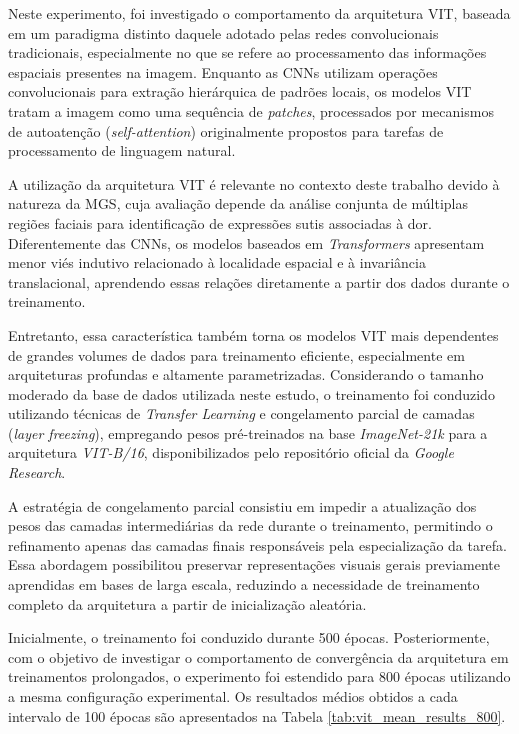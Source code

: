 Neste experimento, foi investigado o comportamento da arquitetura \acs{VIT}, baseada em um paradigma distinto daquele adotado pelas redes convolucionais tradicionais, especialmente no que se refere ao processamento das informações espaciais presentes na imagem. Enquanto as \acsp{CNN} utilizam operações convolucionais para extração hierárquica de padrões locais, os modelos \acs{VIT} tratam a imagem como uma sequência de \textit{patches}, processados por mecanismos de autoatenção (\textit{self-attention}) originalmente propostos para tarefas de processamento de linguagem natural.

A utilização da arquitetura \acs{VIT} é relevante no contexto deste trabalho devido à natureza da \acs{MGS}, cuja avaliação depende da análise conjunta de múltiplas regiões faciais para identificação de expressões sutis associadas à dor. Diferentemente das \acsp{CNN}, os modelos baseados em \textit{Transformers} apresentam menor viés indutivo relacionado à localidade espacial e à invariância translacional, aprendendo essas relações diretamente a partir dos dados durante o treinamento.

Entretanto, essa característica também torna os modelos \acs{VIT} mais dependentes de grandes volumes de dados para treinamento eficiente, especialmente em arquiteturas profundas e altamente parametrizadas. Considerando o tamanho moderado da base de dados utilizada neste estudo, o treinamento foi conduzido utilizando técnicas de \textit{Transfer Learning} e congelamento parcial de camadas (\textit{layer freezing}), empregando pesos pré-treinados na base \textit{ImageNet-21k} para a arquitetura \textit{\acs{VIT}-B/16}, disponibilizados pelo repositório oficial da \textit{Google Research}.

A estratégia de congelamento parcial consistiu em impedir a atualização dos pesos das camadas intermediárias da rede durante o treinamento, permitindo o refinamento apenas das camadas finais responsáveis pela especialização da tarefa. Essa abordagem possibilitou preservar representações visuais gerais previamente aprendidas em bases de larga escala, reduzindo a necessidade de treinamento completo da arquitetura a partir de inicialização aleatória.

Inicialmente, o treinamento foi conduzido durante 500 épocas. Posteriormente, com o objetivo de investigar o comportamento de convergência da arquitetura em treinamentos prolongados, o experimento foi estendido para 800 épocas utilizando a mesma configuração experimental. Os resultados médios obtidos a cada intervalo de 100 épocas são apresentados na Tabela \ref{tab:vit_mean_results_800}.

